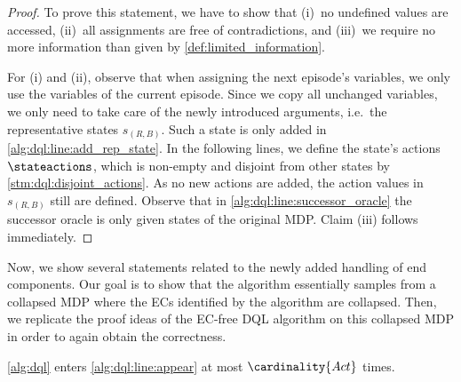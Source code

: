 \documentclass{article}
\newcommand{\Actions}{Act}
\begin{document}
\begin{proof}
	To prove this statement, we have to show that (i)~no undefined values are accessed, (ii)~all assignments are free of contradictions, and (iii)~we require no more information than given by \cref{def:limited_information}.

	For (i) and (ii), observe that when assigning the next episode's variables, we only use the variables of the current episode.
	Since we copy all unchanged variables, we only need to take care of the newly introduced arguments, i.e.\ the representative states $s_{(R, B)}$.
	Such a state is only added in \cref{alg:dql:line:add_rep_state}.
	In the following lines, we define the state's actions $\stateactions$, which is non-empty and disjoint from other states by \cref{stm:dql:disjoint_actions}.
	As no new actions are added, the action values in $s_{(R,B)}$ still are defined.
	Observe that in \cref{alg:dql:line:successor_oracle} the successor oracle is only given states of the original MDP.
	Claim (iii) follows immediately. 
\end{proof}
Now, we show several statements related to the newly added handling of end components.
Our goal is to show that the algorithm essentially samples from a collapsed MDP where the ECs identified by the algorithm are collapsed.
Then, we replicate the proof ideas of the EC-free DQL algorithm on this collapsed MDP in order to again obtain the correctness.
\begin{lemma} \label{stm:dql:finite_representative_states}
	\cref{alg:dql} enters \cref{alg:dql:line:appear} at most $\cardinality{\Actions}$ times.
\end{lemma}
\end{document}
